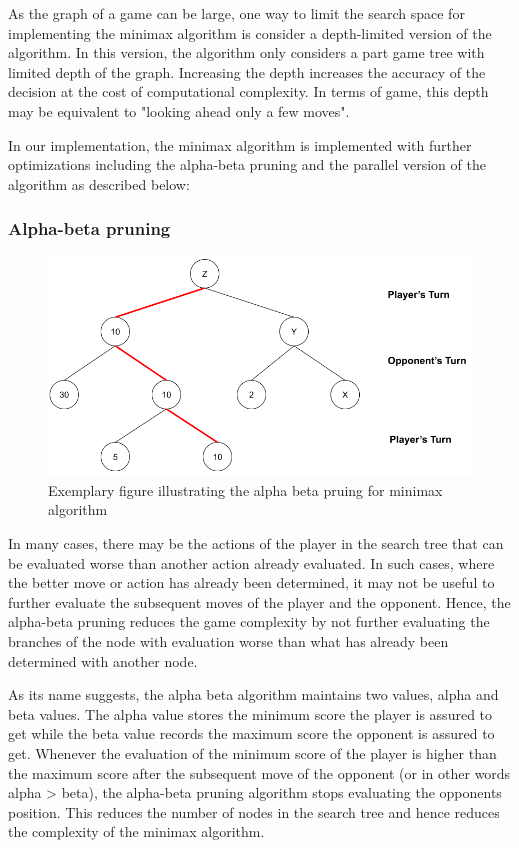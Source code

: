 As the graph of a game can be large, one way to limit the search space for implementing the minimax algorithm is consider a depth-limited version of the algorithm. In this version, the algorithm only considers a part game tree with limited depth of the graph. Increasing the depth increases the accuracy of the decision at the cost of computational complexity. In terms of game, this depth may be equivalent to "looking ahead only a few moves".

In our implementation, the minimax algorithm is implemented with further optimizations including the alpha-beta pruning and the parallel version of the algorithm as described below:

\subsubsection{Alpha-beta pruning}

\begin{figure}[!ht]
    \centering
    \includegraphics[width=\linewidth]{../img/Minimax2.png}
    \caption{Exemplary figure illustrating the alpha beta pruing for minimax algorithm}
    \label{fig:minimax2}
\end{figure}

In many cases, there may be the actions of the player in the search tree that can be evaluated worse than another action already evaluated. In such cases, where the better move or action has already been determined, it may not be useful to further evaluate the subsequent moves of the player and the opponent. Hence, the alpha-beta pruning reduces the game complexity by not further evaluating the branches of the node with evaluation worse than what has already been determined with another node.

As its name suggests, the alpha beta algorithm maintains two values, alpha and beta values. The alpha value stores the minimum score the player is assured to get while the beta value records the maximum score the opponent is assured to get. Whenever the evaluation of the minimum score of the player is higher than the maximum score after the subsequent move of the opponent (or in other words alpha > beta), the alpha-beta pruning algorithm stops evaluating the opponents position. This reduces the number of nodes in the search tree and hence reduces the complexity of the minimax algorithm.

